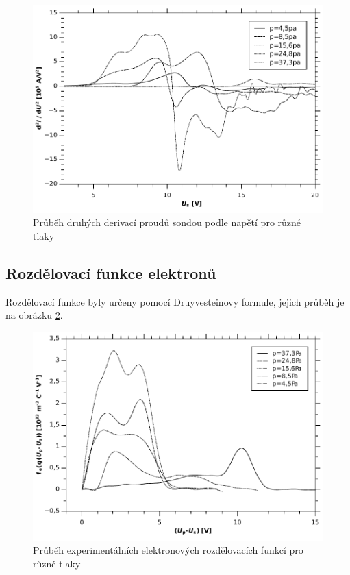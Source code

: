 \documentclass[12pt]{article}
\begin{document}
\begin{figure}[htbp]
\begin{center}
\includegraphics[width=12.8cm]{img/secderiv.pdf}
\caption{Průběh druhých derivací proudů sondou podle napětí pro různé tlaky}
\label{secderiv}
\end{center}
\end{figure}

\subsection{Rozdělovací funkce elektronů}
Rozdělovací funkce byly určeny pomocí Druyvesteinovy formule, jejich průběh je na obrázku \ref{rozdelfunc}.

\begin{figure}[htbp]
\begin{center}
\includegraphics[width=12.8cm]{img/rozdelfunc.pdf}
\caption{Průběh experimentálních elektronových rozdělovacích funkcí pro různé tlaky}
\label{rozdelfunc}
\end{center}
\end{figure}
\end{document}
